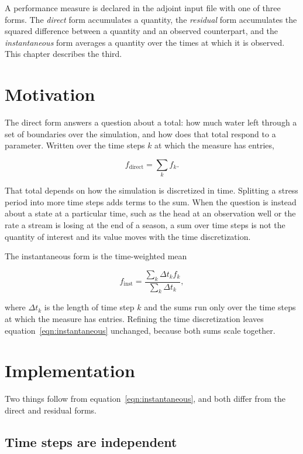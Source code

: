 A performance measure is declared in the adjoint input file with one of three
forms. The \emph{direct} form accumulates a quantity, the \emph{residual} form
accumulates the squared difference between a quantity and an observed
counterpart, and the \emph{instantaneous} form averages a quantity over the
times at which it is observed. This chapter describes the third.

\section{Motivation}

The direct form answers a question about a total: how much water left through a
set of boundaries over the simulation, and how does that total respond to a
parameter. Written over the time steps $k$ at which the measure has entries,

\begin{equation}
	\label{eqn:direct}
	f_{\mathrm{direct}} = \sum_{k} f_{k}.
\end{equation}

That total depends on how the simulation is discretized in time. Splitting a
stress period into more time steps adds terms to the sum. When the question is
instead about a state at a particular time, such as the head at an observation
well or the rate a stream is losing at the end of a season, a sum over time
steps is not the quantity of interest and its value moves with the time
discretization.

The instantaneous form is the time-weighted mean

\begin{equation}
	\label{eqn:instantaneous}
	f_{\mathrm{inst}} = \frac{\sum_{k} \Delta t_{k} f_{k}}
	{\sum_{k} \Delta t_{k}},
\end{equation}

\noindent where $\Delta t_{k}$ is the length of time step $k$ and the sums run
only over the time steps at which the measure has entries. Refining the time
discretization leaves equation~\ref{eqn:instantaneous} unchanged, because both
sums scale together.

\section{Implementation}

Two things follow from equation~\ref{eqn:instantaneous}, and both differ from
the direct and residual forms.

\subsection{Time steps are independent}

